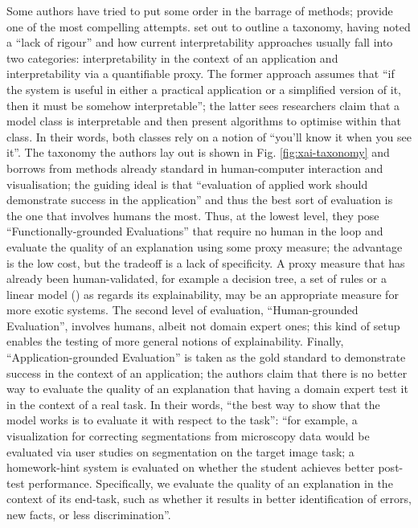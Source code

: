 Some authors have tried to put some order in the barrage of methods; \cite{doshi2017towards} provide one of the most compelling attempts.
 \cite{doshi2017towards} set out to outline a taxonomy, having noted a \enquote{lack of rigour} and how current interpretability approaches usually fall into two categories: interpretability in the context of an application and interpretability via a quantifiable proxy.
 The former approach assumes that \enquote{if the system is useful in either a practical application or a simplified version of it, then it must be somehow interpretable}; the latter sees researchers claim that a model class is interpretable and then present algorithms to optimise within that class.
 In their words, both classes rely on a notion of \enquote{you'll know it when you see it}.
 The taxonomy the authors lay out is shown in Fig. \ref{fig:xai-taxonomy} and borrows from methods already standard in human-computer interaction and visualisation; the guiding ideal is that \enquote{evaluation of applied work should demonstrate success in the application} and thus the best sort of evaluation is the one that involves humans the most.
 Thus, at the lowest level, they pose \enquote{Functionally-grounded Evaluations} that require no human in the loop and evaluate the quality of an explanation using some proxy measure; the advantage is the low cost, but the tradeoff is a lack of specificity.
 A proxy measure that has already been human-validated, for example a decision tree, a set of rules or a linear model (\cite{guidotti2018survey}) as regards its explainability, may be an appropriate measure for more exotic systems.
 The second level of evaluation, \enquote{Human-grounded Evaluation}, involves humans, albeit not domain expert ones; this kind of setup enables the testing of more general notions of explainability.
Finally, \enquote{Application-grounded Evaluation} is taken as the gold standard to demonstrate success in the context of an application; the authors claim that there is no better way to evaluate the quality of an explanation that having a domain expert test it in the context of a real task.
In their words, \enquote{the best way to show that the model works is to evaluate it with respect to the task}: \enquote{for example, a visualization for correcting segmentations from microscopy data would be evaluated via user studies on segmentation on the target image task; a homework-hint system is evaluated on whether the student achieves better post-test performance.  Specifically, we evaluate the quality of an explanation in the context of its end-task, such as whether it results in better identification of errors, new facts, or less discrimination}.

